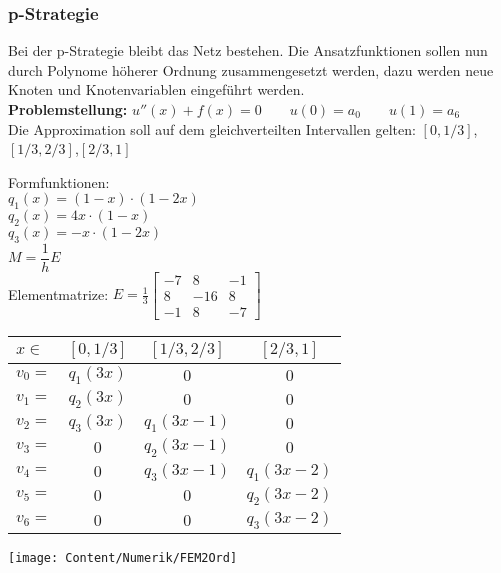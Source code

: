 \subsubsection{p-Strategie}
Bei der p-Strategie bleibt das Netz bestehen. Die Ansatzfunktionen sollen nun durch Polynome höherer Ordnung zusammengesetzt werden, dazu werden neue Knoten und Knotenvariablen eingeführt werden.\\

\textbf{Problemstellung:} $u''(x)+f(x)=0\qquad u(0)=a_0\qquad u(1)=a_6$\\

Die Approximation soll auf dem gleichverteilten Intervallen gelten: $[0,1/3]$,\quad $[1/3,2/3]$,\quad $[2/3,1]$\\

\begin{minipage}{4cm}
	Formfunktionen:\\

	$q_1(x)=(1-x)\cdot(1-2x)$\\
	$q_2(x)=4x\cdot(1-x)$\\
	$q_3(x)=-x\cdot(1-2x)$\\
	$M = \dfrac{1}{h}E$\\
	Elementmatrize: $\boxed{E=\frac{1}{3}
			\begin{bmatrix}
				-7 & 8   & -1 \\
				8  & -16 & 8  \\
				-1 & 8   & -7
			\end{bmatrix}}$\\
\end{minipage}
\hfill
\begin{minipage}{8cm}
	\begin{tabular}{lc|c|c}
		$x\in$ & $[0,1/3]$ & $[1/3,2/3]$ & $[2/3,1]$   \\
		\hline
		$v_0=$ & $q_1(3x)$ & $0$         & $0$         \\
		$v_1=$ & $q_2(3x)$ & $0$         & $0$         \\
		$v_2=$ & $q_3(3x)$ & $q_1(3x-1)$ & $0$         \\
		$v_3=$ & $0$       & $q_2(3x-1)$ & $0$         \\
		$v_4=$ & $0$       & $q_3(3x-1)$ & $q_1(3x-2)$ \\
		$v_5=$ & $0$       & $0$         & $q_2(3x-2)$ \\
		$v_6=$ & $0$       & $0$         & $q_3(3x-2)$ \\
	\end{tabular}
\end{minipage}
\hfill
\begin{minipage}{6cm}
	\texttt{[image: Content/Numerik/FEM2Ord]}
\end{minipage}\\


